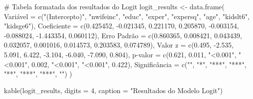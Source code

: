 \documentclass[
  letterpaper,
  DIV=11,
  numbers=noendperiod]{scrartcl}
\newenvironment{Shaded}{\begin{snugshade}}{\end{snugshade}}
\newcommand{\AttributeTok}[1]{\textcolor[rgb]{0.40,0.45,0.13}{#1}}
\newcommand{\CommentTok}[1]{\textcolor[rgb]{0.37,0.37,0.37}{#1}}
\newcommand{\DecValTok}[1]{\textcolor[rgb]{0.68,0.00,0.00}{#1}}
\newcommand{\FloatTok}[1]{\textcolor[rgb]{0.68,0.00,0.00}{#1}}
\newcommand{\FunctionTok}[1]{\textcolor[rgb]{0.28,0.35,0.67}{#1}}
\newcommand{\NormalTok}[1]{\textcolor[rgb]{0.00,0.23,0.31}{#1}}
\newcommand{\OtherTok}[1]{\textcolor[rgb]{0.00,0.23,0.31}{#1}}
\newcommand{\SpecialCharTok}[1]{\textcolor[rgb]{0.37,0.37,0.37}{#1}}
\newcommand{\StringTok}[1]{\textcolor[rgb]{0.13,0.47,0.30}{#1}}
\begin{document}
\begin{Shaded}
\begin{Highlighting}[]
\CommentTok{\# Tabela formatada dos resultados do Logit}
\NormalTok{logit\_results }\OtherTok{\textless{}{-}} \FunctionTok{data.frame}\NormalTok{(}
\NormalTok{  Variável }\OtherTok{=} \FunctionTok{c}\NormalTok{(}\StringTok{"(Intercepto)"}\NormalTok{, }\StringTok{"nwifeinc"}\NormalTok{, }\StringTok{"educ"}\NormalTok{, }\StringTok{"exper"}\NormalTok{, }\StringTok{"expersq"}\NormalTok{, }\StringTok{"age"}\NormalTok{, }\StringTok{"kidslt6"}\NormalTok{, }\StringTok{"kidsge6"}\NormalTok{),}
  \AttributeTok{Coeficiente =} \FunctionTok{c}\NormalTok{(}\FloatTok{0.425452}\NormalTok{, }\SpecialCharTok{{-}}\FloatTok{0.021345}\NormalTok{, }\FloatTok{0.221170}\NormalTok{, }\FloatTok{0.205870}\NormalTok{, }\SpecialCharTok{{-}}\FloatTok{0.003154}\NormalTok{, }\SpecialCharTok{{-}}\FloatTok{0.088024}\NormalTok{, }\SpecialCharTok{{-}}\FloatTok{1.443354}\NormalTok{, }\FloatTok{0.060112}\NormalTok{),}
  \StringTok{\textasciigrave{}}\AttributeTok{Erro Padrão}\StringTok{\textasciigrave{}} \OtherTok{=} \FunctionTok{c}\NormalTok{(}\FloatTok{0.860365}\NormalTok{, }\FloatTok{0.008421}\NormalTok{, }\FloatTok{0.043439}\NormalTok{, }\FloatTok{0.032057}\NormalTok{, }\FloatTok{0.001016}\NormalTok{, }\FloatTok{0.014573}\NormalTok{, }\FloatTok{0.203583}\NormalTok{, }\FloatTok{0.074789}\NormalTok{),}
  \StringTok{\textasciigrave{}}\AttributeTok{Valor z}\StringTok{\textasciigrave{}} \OtherTok{=} \FunctionTok{c}\NormalTok{(}\FloatTok{0.495}\NormalTok{, }\SpecialCharTok{{-}}\FloatTok{2.535}\NormalTok{, }\FloatTok{5.091}\NormalTok{, }\FloatTok{6.422}\NormalTok{, }\SpecialCharTok{{-}}\FloatTok{3.104}\NormalTok{, }\SpecialCharTok{{-}}\FloatTok{6.040}\NormalTok{, }\SpecialCharTok{{-}}\FloatTok{7.090}\NormalTok{, }\FloatTok{0.804}\NormalTok{),}
  \StringTok{\textasciigrave{}}\AttributeTok{p{-}valor}\StringTok{\textasciigrave{}} \OtherTok{=} \FunctionTok{c}\NormalTok{(}\FloatTok{0.621}\NormalTok{, }\FloatTok{0.011}\NormalTok{, }\StringTok{"\textless{}0.001"}\NormalTok{, }\StringTok{"\textless{}0.001"}\NormalTok{, }\FloatTok{0.002}\NormalTok{, }\StringTok{"\textless{}0.001"}\NormalTok{, }\StringTok{"\textless{}0.001"}\NormalTok{, }\FloatTok{0.422}\NormalTok{),}
\NormalTok{  Significância }\OtherTok{=} \FunctionTok{c}\NormalTok{(}\StringTok{""}\NormalTok{, }\StringTok{"*"}\NormalTok{, }\StringTok{"***"}\NormalTok{, }\StringTok{"***"}\NormalTok{, }\StringTok{"**"}\NormalTok{, }\StringTok{"***"}\NormalTok{, }\StringTok{"***"}\NormalTok{, }\StringTok{""}\NormalTok{)}
\NormalTok{)}

\FunctionTok{kable}\NormalTok{(logit\_results, }\AttributeTok{digits =} \DecValTok{4}\NormalTok{, }\AttributeTok{caption =} \StringTok{"Resultados do Modelo Logit"}\NormalTok{)}
\end{Highlighting}
\end{Shaded}
\end{document}
